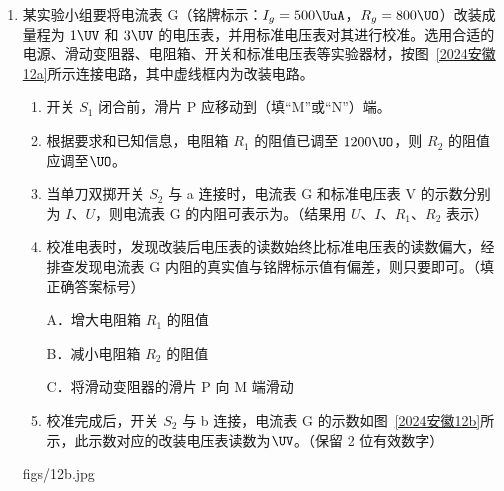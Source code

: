 \documentclass[\gkver]{gaokaozhenti}
\begin{document}
\begin{enumerate}
{可知绿光的折射率大于红光的折射率，又因为绿光的频率大于红光的频率，所以频率大，折射率大。

（3）根据折射定律可知，玻璃的折射率为

$n_{\text{玻璃}} = \frac{\sin\alpha_{1}}{\sin\alpha_{2}}$

该介质的折射率为

$n_{\text{介质}} = \frac{\sin\alpha_{1}}{\sin\alpha_{3}}$

其中 $\alpha_{2} < \alpha_{3}$，所以 $n_{\text{玻璃}} > n_{\text{介质}}$。
}

\item
某实验小组要将电流表 G（铭牌标示：$I_{g} = 500 \UuA$，$R_{g} = 800 \UO$）改装成量程为 $1 \UV$ 和 $3 \UV$ 的电压表，并用标准电压表对其进行校准。选用合适的电源、滑动变阻器、电阻箱、开关和标准电压表等实验器材，按图~\ref{2024安徽12a}所示连接电路，其中虚线框内为改装电路。
\begin{enumerate}
	\item
	开关 $S_{1}$ 闭合前，滑片 P 应移动到（填“M”或“N”）端。
	\item
	根据要求和已知信息，电阻箱 $R_{1}$ 的阻值已调至 $1200 \UO$，则 $R_{2}$ 的阻值应调至$\UO$。
	\item
	当单刀双掷开关 $S_{2}$ 与 a 连接时，电流表 G 和标准电压表 V 的示数分别为 $I$、$U$，则电流表 G 的内阻可表示为。（结果用 $U$、$I$、$R_{1}$、$R_{2}$ 表示）
	\item
	校准电表时，发现改装后电压表的读数始终比标准电压表的读数偏大，经排查发现电流表 G 内阻的真实值与铭牌标示值有偏差，则只要即可。（填正确答案标号）

	A．增大电阻箱 $R_{1}$ 的阻值

	B．减小电阻箱 $R_{2}$ 的阻值

	C．将滑动变阻器的滑片 P 向 M 端滑动
	\item
	校准完成后，开关 $S_{2}$ 与 b 连接，电流表 G 的示数如图~\ref{2024安徽12b}所示，此示数对应的改装电压表读数为$\UV$。（保留 2 位有效数字）
\end{enumerate}
{figs/12b.jpg}

\end{enumerate}
\end{document}
